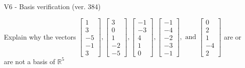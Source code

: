 \begin{exercise}
  \begin{exerciseTitle}V6 - Basis verification (ver. 384)\end{exerciseTitle}
  \begin{exerciseStatement}
    Explain why the vectors \(\left[\begin{array}{r}
1 \\
3 \\
-5 \\
-1 \\
3
\end{array}\right] , \left[\begin{array}{r}
3 \\
0 \\
1 \\
-2 \\
-5
\end{array}\right] , \left[\begin{array}{r}
-1 \\
-3 \\
4 \\
1 \\
0
\end{array}\right] , \left[\begin{array}{r}
-1 \\
-4 \\
-2 \\
-3 \\
-1
\end{array}\right] , \text{ and } \left[\begin{array}{r}
0 \\
2 \\
1 \\
-4 \\
2
\end{array}\right]\) are or are not a basis of \(\mathbb{R}^5\)	



\end{exerciseStatement}
\end{exercise}
